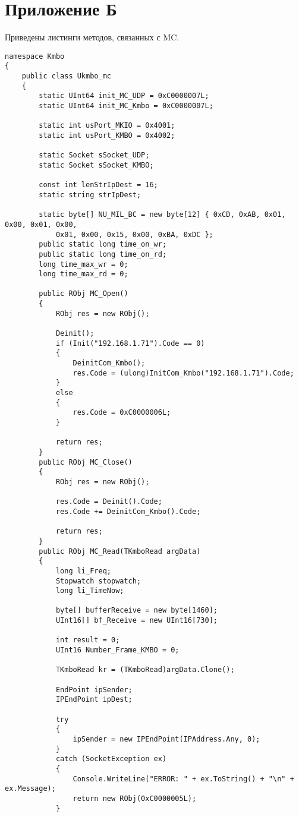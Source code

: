 \section*{\hfill Приложение Б \hfill}
Приведены листинги методов, связанных с MC.

\begin{lstlisting}[label=mc,caption=Основные функции взаимодействия с MC]
namespace Kmbo
{
	public class Ukmbo_mc
	{
		static UInt64 init_MC_UDP = 0xC0000007L;         
		static UInt64 init_MC_Kmbo = 0xC0000007L;        
		
		static int usPort_MKIO = 0x4001;                 
		static int usPort_KMBO = 0x4002;                 
		
		static Socket sSocket_UDP;
		static Socket sSocket_KMBO;
		
		const int lenStrIpDest = 16;
		static string strIpDest;
		
		static byte[] NU_MIL_BC = new byte[12] { 0xCD, 0xAB, 0x01, 0x00, 0x01, 0x00,
			0x01, 0x00, 0x15, 0x00, 0xBA, 0xDC };
		public static long time_on_wr;
		public static long time_on_rd;
		long time_max_wr = 0;
		long time_max_rd = 0;
		
		public RObj MC_Open()
		{
			RObj res = new RObj();
			
			Deinit();
			if (Init("192.168.1.71").Code == 0) 
			{
				DeinitCom_Kmbo();
				res.Code = (ulong)InitCom_Kmbo("192.168.1.71").Code;
			}
			else
			{
				res.Code = 0xC0000006L;
			}
			
			return res;
		}
		public RObj MC_Close()
		{
			RObj res = new RObj();
			
			res.Code = Deinit().Code;
			res.Code += DeinitCom_Kmbo().Code;
			
			return res;
		}
		public RObj MC_Read(TKmboRead argData)
		{
			long li_Freq;
			Stopwatch stopwatch;
			long li_TimeNow;
			
			byte[] bufferReceive = new byte[1460];
			UInt16[] bf_Receive = new UInt16[730];
			
			int result = 0;
			UInt16 Number_Frame_KMBO = 0;
			
			TKmboRead kr = (TKmboRead)argData.Clone();
			
			EndPoint ipSender;
			IPEndPoint ipDest;
			
			try
			{
				ipSender = new IPEndPoint(IPAddress.Any, 0);
			}
			catch (SocketException ex)
			{
				Console.WriteLine("ERROR: " + ex.ToString() + "\n" + ex.Message);
				return new RObj(0xC0000005L);
			}
			

\end{lstlisting}
